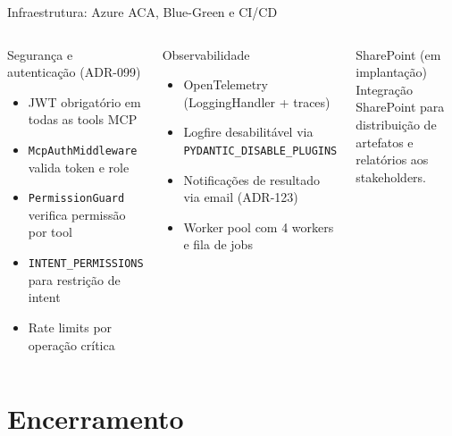 \documentclass[aspectratio=169,10pt]{beamer}
\begin{document}
\begin{frame}{Infraestrutura: Azure ACA, Blue-Green e CI/CD}
\begin{columns}[T]
    \begin{block}{Segurança e autenticação (ADR-099)}
      \begin{itemize}\scriptsize
        \item JWT obrigatório em todas as tools MCP
        \item \texttt{McpAuthMiddleware} valida token e role
        \item \texttt{PermissionGuard} verifica permissão por tool
        \item \texttt{INTENT\_PERMISSIONS} para restrição de intent
        \item Rate limits por operação crítica
      \end{itemize}
    \end{block}
    \vspace{4pt}
    \begin{block}{Observabilidade}
      \begin{itemize}\scriptsize
        \item OpenTelemetry (LoggingHandler + traces)
        \item Logfire desabilitável via \texttt{PYDANTIC\_DISABLE\_PLUGINS}
        \item Notificações de resultado via email (ADR-123)
        \item Worker pool com 4 workers e fila de jobs
      \end{itemize}
    \end{block}
    \vspace{4pt}
    \begin{exampleblock}{\small SharePoint (em implantação)}
      \scriptsize Integração SharePoint para distribuição de artefatos
      e relatórios aos stakeholders.
    \end{exampleblock}
  \end{columns}
\end{frame}

\section{Encerramento}
\end{document}
